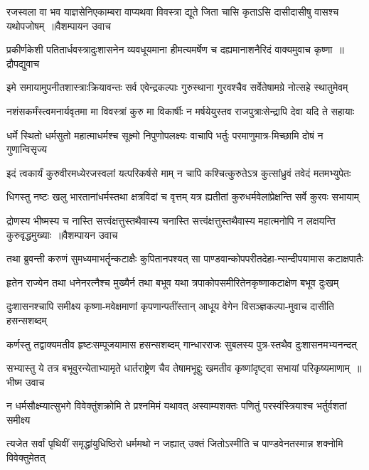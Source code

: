 \threelineshloka
{रजस्वला वा भव याज्ञसेनिएकाम्बरा वाप्यथवा विवस्त्रा}
{द्यूते जिता चासि कृताऽसि दासीदासीषु वासश्च यथोपजोषम् ॥वैशम्पायन उवाच}
{}


\threelineshloka
{प्रकीर्णकेशी पतितार्धवस्त्रादुःशासनेन व्यवधूयमाना}
{हीमत्यमर्षेण च दह्यमानाशनैरिदं वाक्यमुवाच कृष्णा ॥द्रौपद्युवाच}
{}


\twolineshloka
{इमे समायामुपनीतशास्त्राःक्रियावन्तः सर्व एवेन्द्रकल्पाः}
{गुरुस्थाना गुरवश्चैव सर्वेतेषामग्रे नोत्सहे स्थातुमेवम्}


\twolineshloka
{नशंसकर्मंस्त्वमनार्यवृतमा मा विवस्त्रां कुरु मा विकार्षीः}
{न मर्षयेयुस्तव राजपुत्राःसेन्द्रापि देवा यदि ते सहायाः}


\twolineshloka
{धर्मे स्थितो धर्मसुतो महात्माधर्मश्च सूक्ष्मो निपुणोपलक्ष्यः}
{वाचापि भर्तुः परमाणुमात्र-मिच्छामि दोषं न गुणान्विसृज्य}


\twolineshloka
{इदं त्वकार्यं कुरुवीरमध्येरजस्वलां यत्परिकर्षसे माम्}
{न चापि कश्चित्कुरुतेऽत्र कुत्सांध्रुवं तवेदं मतमभ्युपेतः}


\twolineshloka
{धिगस्तु नष्टः खलु भारतानांधर्मस्तथा क्षत्रविदां च वृत्तम्}
{यत्र ह्यतीतां कुरुधर्मवेलांप्रेक्षन्ति सर्वे कुरवः सभायाम्}


\twolineshloka
{द्रोणस्य भीष्मस्य च नास्ति सत्त्वंक्षत्तुस्तथैवास्य चनास्ति सत्त्वंक्षत्तुस्तथैवास्य महात्मनोपि}
{न लक्षयन्ति कुरुवृद्धमुख्याः ॥वैशम्पायन उवाच}


\twolineshloka
{तथा ब्रुवन्ती करुणं सुमध्यमाभर्तॄन्कटाक्षैः कुपितानपश्यत्}
{सा पाण्डवान्कोपपरीतदेहा-न्सन्दीपयामास कटाक्षपातैः}


\twolineshloka
{हृतेन राज्येन तथा धनेनरत्नैश्च मुख्यैर्न तथा बभूव}
{यथा त्रपाकोपसमीरितेनकृष्णाकटाक्षेण बभूव दुःखम्}


\twolineshloka
{दुःशासनश्चापि समीक्ष्य कृष्णा-मवेक्षमाणां कृपणान्पतींस्तान्}
{आधूय वेगेन विसञ्ज्ञकल्पा-मुवाच दासीति हसन्सशब्दम्}


\twolineshloka
{कर्णस्तु तद्वाक्यमतीव हृष्टःसम्पूजयामास हसन्सशब्दम्}
{गान्धारराजः सुबलस्य पुत्र-स्तथैव दुःशासनमभ्यनन्दत्}


\threelineshloka
{सभ्यास्तु ये तत्र बभूवुरन्येताभ्यामृते धार्तराष्ट्रेण चैव}
{तेषामभूद्दुः खमतीव कृष्णांदृष्ट्वा सभायां परिकृष्यमाणाम् ॥भीष्म उवाच}
{}


\twolineshloka
{न धर्मसौक्ष्म्यात्सुभगे विवेक्तुंशक्रोमि ते प्रश्नमिमं यथावत्}
{अस्वाम्यशक्तः पणितुं परस्वंस्त्रियाश्च भर्तुर्वशतां समीक्ष्य}


\twolineshloka
{त्यजेत सर्वां पृथिवीं समृद्धांयुधिष्ठिरो धर्ममथो न जह्यात्}
{उक्तं जितोऽस्मीति च पाण्डवेनतस्मान्न शक्नोमि विवेक्तुमेतत्}


